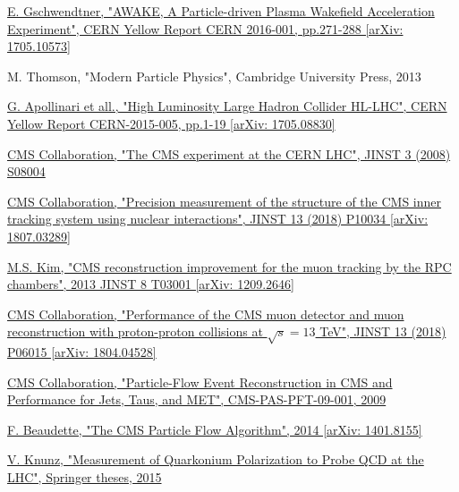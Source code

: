\documentclass[a4paper, 10pt, openright]{report}
\begin{document}
\begin{thebibliography}{1}
\href{https://arxiv.org/abs/1705.10573}{E. Gschwendtner,
"AWAKE, A Particle-driven Plasma Wakefield Acceleration Experiment",
CERN Yellow Report CERN 2016-001, pp.271-288 [arXiv: 1705.10573]
}

M. Thomson,
"Modern Particle Physics",
Cambridge University Press, 2013

\href{https://arxiv.org/abs/1705.08830}{G. Apollinari et all.,
"High Luminosity Large Hadron Collider HL-LHC",
CERN Yellow Report CERN-2015-005, pp.1-19 [arXiv: 1705.08830]
}

\href{https://iopscience.iop.org/article/10.1088/1748-0221/3/08/S08004/pdf}{CMS Collaboration,
"The CMS experiment at the CERN LHC",
JINST 3 (2008) S08004
}

\href{https://arxiv.org/abs/1807.03289}{CMS Collaboration,
"Precision measurement of the structure of the CMS inner tracking system using nuclear interactions",
JINST 13 (2018) P10034 [arXiv: 1807.03289]
}

\href{https://arxiv.org/abs/1209.2646}{M.S. Kim,
"CMS reconstruction improvement for the muon tracking by the RPC chambers",
2013 JINST 8 T03001 [arXiv: 1209.2646]}

\href{https://arxiv.org/abs/1804.04528}{CMS Collaboration,
"Performance of the CMS muon detector and muon reconstruction with proton-proton collisions at $\sqrt{s} = 13$ TeV",
JINST 13 (2018) P06015 [arXiv: 1804.04528]}

\href{http://inspirehep.net/record/925379/}{CMS Collaboration,
"Particle-Flow Event Reconstruction in CMS and Performance for Jets, Taus, and MET",
CMS-PAS-PFT-09-001, 2009}

\href{https://arxiv.org/abs/1401.8155}{F. Beaudette,
"The CMS Particle Flow Algorithm",
2014 [arXiv: 1401.8155]}

\href{http://inspirehep.net/record/1381380}{V. Knunz,
"Measurement of Quarkonium Polarization to Probe QCD at the LHC",
Springer theses, 2015}

\end{thebibliography}
\end{document}

